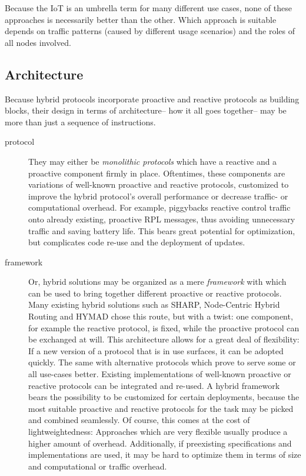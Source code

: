 \documentclass[a4paper,10pt]{scrartcl}
\begin{document}

Because the IoT is an umbrella term for many different use cases, none of these approaches is necessarily better than the other. Which approach is suitable depends on traffic patterns (caused by different usage scenarios) and the roles of all nodes involved.

\subsection{Architecture}
\label{subsec:architecture}
Because hybrid protocols incorporate proactive and reactive protocols as building blocks, their design in terms of architecture-- how it all goes together-- may be more than just a sequence of instructions. 
\begin{description}
\item[protocol] They may either be \emph{monolithic protocols} which have a reactive and a proactive component firmly in place. Oftentimes, these components are variations of well-known proactive and reactive protocols, customized to improve the hybrid protocol's overall performance or decrease traffic- or computational overhead. For example, \cite{baccelli_p2p_rpl} piggybacks reactive control traffic onto already existing, proactive RPL messages, thus avoiding unnecessary traffic and saving battery life. %
This bears great potential for optimization, but complicates code re-use and the deployment of updates.\\
\item[framework] Or, hybrid solutions may be organized as a mere \emph{framework} with which can be used to bring together different proactive or reactive protocols. Many existing hybrid solutions such as SHARP, Node-Centric Hybrid Routing and HYMAD chose this route, but with a twist: one component, for example the reactive protocol, is fixed, while the proactive protocol can be exchanged at will. This architecture allows for a great deal of flexibility: If a new version of a protocol that is in use surfaces, it can be adopted quickly. The same with alternative protocols which prove to serve some or all use-cases better. Existing implementations of well-known proactive or reactive protocols can be integrated and re-used.
A hybrid framework bears the possibility to be customized for certain deployments, because the most suitable proactive and reactive protocols for the task may be picked and combined seamlessly.
Of course, this comes at the cost of lightweightedness: Approaches which are very flexible usually produce a higher amount of overhead. Additionally, if preexisting specifications and implementations are used, it may be hard to optimize them in terms of size and computational or traffic overhead.
\end{description}
\end{document}
